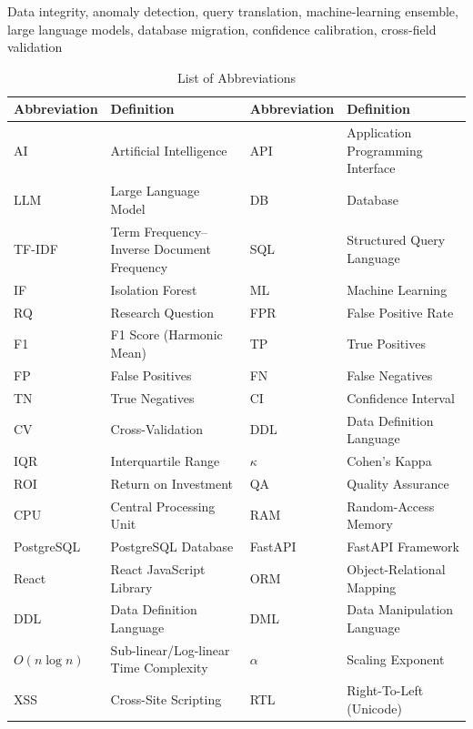 \documentclass{ieeeaccess}
\begin{document}
\begin{keywords}
Data integrity, anomaly detection, query translation, machine-learning ensemble, large language models, database
migration, confidence calibration, cross-field validation
\end{keywords}

\titlepgskip=-15pt

\maketitle

\begin{table}[tp]
\centering
\caption{List of Abbreviations}
\label{tab:abbreviations}
\begin{tabular}{|l|l||l|l|}
\hline
\textbf{Abbreviation} & \textbf{Definition} & \textbf{Abbreviation} & \textbf{Definition} \\
\hline
AI & Artificial Intelligence & API & Application Programming Interface \\
\hline
LLM & Large Language Model & DB & Database \\
\hline
TF-IDF & Term Frequency--Inverse Document Frequency & SQL & Structured Query Language \\
\hline
IF & Isolation Forest & ML & Machine Learning \\
\hline
RQ & Research Question & FPR & False Positive Rate \\
\hline
F1 & F1 Score (Harmonic Mean) & TP & True Positives \\
\hline
FP & False Positives & FN & False Negatives \\
\hline
TN & True Negatives & CI & Confidence Interval \\
\hline
CV & Cross-Validation & DDL & Data Definition Language \\
\hline
IQR & Interquartile Range & $\kappa$ & Cohen's Kappa \\
\hline
ROI & Return on Investment & QA & Quality Assurance \\
\hline
CPU & Central Processing Unit & RAM & Random-Access Memory \\
\hline
PostgreSQL & PostgreSQL Database & FastAPI & FastAPI Framework \\
\hline
React & React JavaScript Library & ORM & Object-Relational Mapping \\
\hline
DDL & Data Definition Language & DML & Data Manipulation Language \\
\hline
$O(n \log n)$ & Sub-linear/Log-linear Time Complexity & $\alpha$ & Scaling Exponent \\
\hline
XSS & Cross-Site Scripting & RTL & Right-To-Left (Unicode) \\
\hline
\end{tabular}
\end{table}
\end{document}
